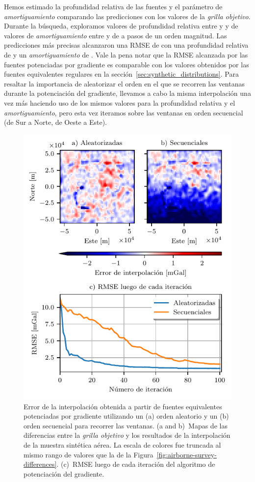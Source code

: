 Hemos estimado la profundidad relativa de las fuentes y el parámetro de
\emph{amortiguamiento} comparando las predicciones con los valores de la
\emph{grilla objetivo}.
Durante la búsqueda, exploramos valores de profundidad relativa entre
\EqlBoostAirborneMinDepth{} y
\EqlBoostAirborneMaxDepth{} y de valores de \emph{amortiguamiento} entre
\EqlBoostAirborneMinDamping{} y \EqlBoostAirborneMaxDamping{}
de a pasos de un orden magnitud.
Las predicciones más precisas alcanzaron una \ac{RMSE} de
\EqlBoostAirborneRmsScore{} con una profundidad relativa de
\EqlBoostAirborneDepth{} y
un \emph{amortiguamiento} de \EqlBoostAirborneDamping{}.
Vale la pena notar que la \ac{RMSE} alcanzada por las fuentes potenciadas por
gradiente es comparable con los valores obtenidos por las fuentes equivalentes
regulares en la sección~\ref{sec:synthetic_distributions}.
Para resaltar la importancia de aleatorizar el orden en el que se recorren las
ventanas durante la potenciación del gradiente, llevamos a cabo la misma
interpolación una vez más haciendo uso de los mismos valores para la profundidad
relativa y el \emph{amortiguamiento}, pero esta vez iteramos sobre las ventanas
en orden secuencial (de Sur a Norte, de Oeste a Este).

\begin{figure}
    \centering
    \includegraphics[width=0.7\linewidth]{figs/eql-gradient-boosted/eql-boost-airborne.pdf}
    \caption{
        Error de la interpolación obtenida a partir de fuentes equivalentes
        potenciadas por gradiente utilizando un (a) orden aleatorio y un (b)
        orden secuencial para recorrer las ventanas.
        (a and b)~Mapas de las diferencias entre la \emph{grilla objetivo}
        y los resultados de la interpolación de la muestra sintética aérea.
        La escala de colores fue truncada al mismo rango de valores que la de
        la Figura~\ref{fig:airborne-survey-differences}.
        (c)~\acl{RMSE} luego de cada iteración del algoritmo de potenciación del
        gradiente.
}
\label{fig:eql-boost-airborne}
\end{figure}


